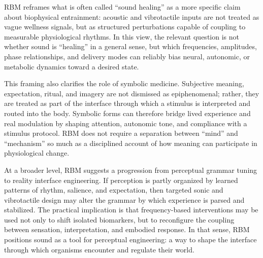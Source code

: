 RBM reframes what is often called ``sound healing'' as a more specific claim about biophysical entrainment: acoustic and vibrotactile inputs are not treated as vague wellness signals, but as structured perturbations capable of coupling to measurable physiological rhythms. In this view, the relevant question is not whether sound is ``healing'' in a general sense, but which frequencies, amplitudes, phase relationships, and delivery modes can reliably bias neural, autonomic, or metabolic dynamics toward a desired state.

This framing also clarifies the role of symbolic medicine. Subjective meaning, expectation, ritual, and imagery are not dismissed as epiphenomenal; rather, they are treated as part of the interface through which a stimulus is interpreted and routed into the body. Symbolic forms can therefore bridge lived experience and real modulation by shaping attention, autonomic tone, and compliance with a stimulus protocol. RBM does not require a separation between ``mind'' and ``mechanism'' so much as a disciplined account of how meaning can participate in physiological change.

At a broader level, RBM suggests a progression from perceptual grammar tuning to reality interface engineering. If perception is partly organized by learned patterns of rhythm, salience, and expectation, then targeted sonic and vibrotactile design may alter the grammar by which experience is parsed and stabilized. The practical implication is that frequency-based interventions may be used not only to shift isolated biomarkers, but to reconfigure the coupling between sensation, interpretation, and embodied response. In that sense, RBM positions sound as a tool for perceptual engineering: a way to shape the interface through which organisms encounter and regulate their world.
